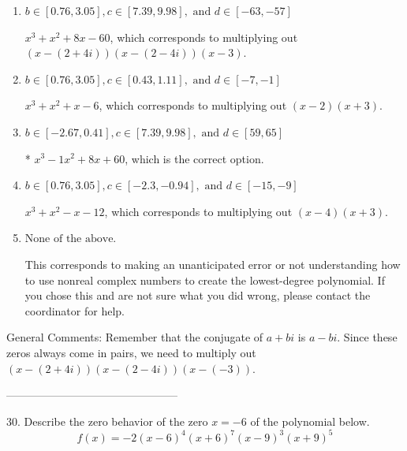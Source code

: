\documentclass{article}[14pt]
\begin{document}
\begin{enumerate}[label=\Alph*.] 
\item $ b \in [0.76, 3.05], c \in [7.39, 9.98], \text{ and } d \in [-63, -57] $ 

 $x^{3} + x^{2} +8 x -60$, which corresponds to multiplying out $(x-(2 + 4i))(x-(2 - 4i))(x -3)$. 
\item $ b \in [0.76, 3.05], c \in [0.43, 1.11], \text{ and } d \in [-7, -1] $ 

 $x^{3} + x^{2} +x -6$, which corresponds to multiplying out $(x -2)(x + 3)$. 
\item $ b \in [-2.67, 0.41], c \in [7.39, 9.98], \text{ and } d \in [59, 65] $ 

 * $x^{3} -1 x^{2} +8 x + 60$, which is the correct option. 
\item $ b \in [0.76, 3.05], c \in [-2.3, -0.94], \text{ and } d \in [-15, -9] $ 

 $x^{3} + x^{2} -x -12$, which corresponds to multiplying out $(x -4)(x + 3)$. 
\item $ \text{None of the above.} $ 

 This corresponds to making an unanticipated error or not understanding how to use nonreal complex numbers to create the lowest-degree polynomial. If you chose this and are not sure what you did wrong, please contact the coordinator for help. 
\end{enumerate} 
 
General Comments: Remember that the conjugate of $a+bi$ is $a-bi$. Since these zeros always come in pairs, we need to multiply out $(x-(2 + 4i))(x-(2 - 4i))(x-(-3))$.

-----------------------------------------------

30. Describe the zero behavior of the zero $x = -6$ of the polynomial below.
$$ f(x) = -2(x - 6)^{4}(x + 6)^{7}(x - 9)^{3}(x + 9)^{5} $$ 
\end{document}
